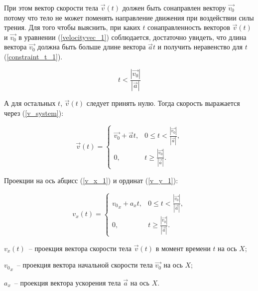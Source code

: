 При этом вектор скорости тела \(\vec{v}(t)\) должен быть сонаправлен вектору \(\vec{v_0}\)
потому что тело не может поменять направление движения при воздействии силы трения.
Для того чтобы выяснить, при каких \(t\) сонаправленность векторов \(\vec{v}(t)\) и \(\vec{v_0}\)
в уравнении (\ref{velocityvec_1}) соблюдается,
достаточно увидеть, что длина вектора \(\vec{v_0}\) должна быть больше длине вектора \(\vec{a}t\)
и получить неравенство для \(t\) (\ref{constraint_t_1}).


\newcommand\Constrainttle{
  t < \frac{\left|\vec{v_0}\right|}{\left|\vec{a}\right|}
}

\newcommand\Constrainttge{
  t \geqslant \frac{\left|\vec{v_0}\right|}{\left|\vec{a}\right|}
}

\begin{equation}\label{constraint_t_1}
  \Constrainttle
\end{equation}

А для остальных \(t\), \(\vec{v}(t)\) следует принять нулю. Тогда скорость выражается через (\ref{v_system}):

\begin{equation}\label{v_system}
  \vec{v}(t) =
  \begin{cases}
    \vec{v_0} + \vec{a}t, & 0 \leqslant \Constrainttle, \\
    0,                    & \Constrainttge .
  \end{cases}
\end{equation}

Проекции на ось абцисс (\ref{v_x_1}) и ординат (\ref{v_y_1}):

\begin{equation}\label{v_x_1}
  v_x(t) =
  \begin{cases}
    {v_0}_x + a_x t, & 0 \leqslant \Constrainttle, \\
    0,               & \Constrainttge.
  \end{cases}
\end{equation}

\begin{Underequation}
  \(v_x(t)\)~-- проекция вектора скорости тела \(\vec{v}(t)\) в момент времени \(t\) на ось \(X\);

  \({v_0}_x\)~-- проекция вектора начальной скорости тела \(\vec{v_0}\) на ось \(X\);

  \(a_x\)~-- проекция вектора ускорения тела \(\vec{a}\) на ось \(X\).
\end{Underequation}

